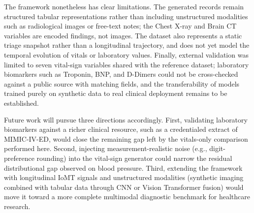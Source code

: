 The framework nonetheless has clear limitations. The generated records remain structured tabular representations rather than including unstructured modalities such as radiological images or free-text notes; the Chest X-ray and Brain CT variables are encoded findings, not images. The dataset also represents a static triage snapshot rather than a longitudinal trajectory, and does not yet model the temporal evolution of vitals or laboratory values. Finally, external validation was limited to seven vital-sign variables shared with the reference dataset; laboratory biomarkers such as Troponin, BNP, and D-Dimers could not be cross-checked against a public source with matching fields, and the transferability of models trained purely on synthetic data to real clinical deployment remains to be established.

Future work will pursue three directions accordingly. First, validating laboratory biomarkers against a richer clinical resource, such as a credentialed extract of MIMIC-IV-ED, would close the remaining gap left by the vitals-only comparison performed here. Second, injecting measurement-realistic noise (e.g., digit-preference rounding) into the vital-sign generator could narrow the residual distributional gap observed on blood pressure. Third, extending the framework with longitudinal IoMT signals and unstructured modalities (synthetic imaging combined with tabular data through CNN or Vision Transformer fusion) would move it toward a more complete multimodal diagnostic benchmark for healthcare research.